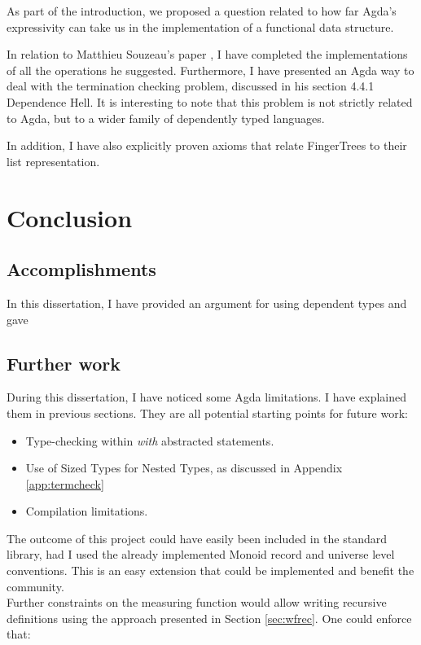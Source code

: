 \documentclass[12pt,twoside,notitlepage]{report}
\begin{document}
As part of the introduction, we proposed a question related to how far Agda's expressivity can take us in the implementation of a functional data structure.

In relation to Matthieu Souzeau's paper \cite{coq}, I have completed the implementations of all the operations he suggested. Furthermore, I have presented an Agda way to deal with the termination checking problem, discussed in his section 4.4.1 Dependence Hell. 
It is interesting to note that this problem is not strictly related to Agda, but to a wider family of dependently typed languages. 

In addition, I have also explicitly proven axioms that relate FingerTrees to their list representation.


\chapter{Conclusion}

\section{Accomplishments}

In this dissertation, I have provided an argument for using dependent types and gave 


\section{Further work}

During this dissertation, I have noticed some Agda limitations. I have explained them in previous sections. They are all potential starting points for future work:

\begin{itemize}
\item Type-checking within \textit{with} abstracted statements.
\item Use of Sized Types for Nested Types, as discussed in Appendix \ref{app:termcheck}
\item Compilation limitations.
\end{itemize} \hfill
The outcome of this project could have easily been included in the standard library, had I used the already implemented Monoid record and universe level conventions. This is an easy extension that could be implemented and benefit the community.\\
Further constraints on the measuring function would allow writing recursive definitions using the approach presented in Section \ref{sec:wfrec}. One could enforce that:
\end{document}
